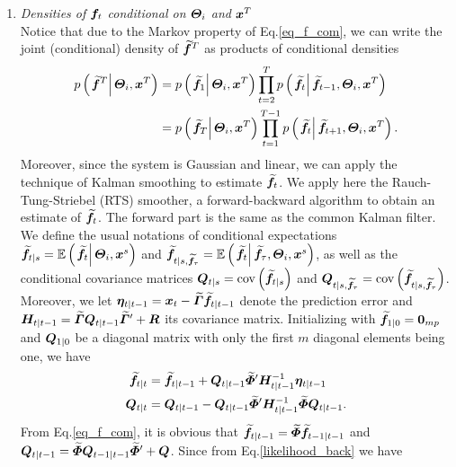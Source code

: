 \begin{enumerate}
\item 
\textit{Densities of $\bm f_t$ conditional on $\bm \varTheta_i$ and $\bm x^T$}\\
Notice that due to the Markov property of Eq.\eqref{eq_f_com}, we can write the joint (conditional) density of $\widetilde{\bm f}^T$ as products of conditional densities
\begin{align}
	p\left(\left.\widetilde{\bm f}^T\right|\bm \varTheta_i,\bm x^T\right)
		&=p\left(\left.\widetilde{\bm f}_1\right|\bm \varTheta_i,\bm x^T\right)
			\prod_{t=2}^Tp\left(\left.\widetilde{\bm f}_t\right|\widetilde{\bm f}_{t-1},\bm \varTheta_i,\bm x^T\right)\\
\label{likelihood_back}
		&=p\left(\left.\widetilde{\bm f}_T\right|\bm \varTheta_i,\bm x^T\right)
			\prod_{t=1}^{T-1}p\left(\left.\widetilde{\bm f}_t\right|\widetilde{\bm f}_{t+1},\bm \varTheta_i,\bm x^T\right).
\end{align}
Moreover, since the system is Gaussian and linear, we can apply the technique of Kalman smoothing to estimate $\widetilde{\bm f}_t$. We apply here the Rauch-Tung-Striebel (RTS) smoother, a forward-backward algorithm to obtain an estimate of $\widetilde{\bm f}_t$. The forward part is the same as the common Kalman filter. We define the usual notations of conditional expectations 
$\widetilde{\bm f}_{t|s}=\mathbb{E}\left(\left.\widetilde{\bm f}_t\right|\bm \varTheta_i,\bm x^s\right)$
and
$\widetilde{\bm f}_{t|s,\widetilde{\bm f}_\tau}=\mathbb{E}\left(\left.\widetilde{\bm f}_t\right|\widetilde{\bm f}_\tau,\bm \varTheta_i,\bm x^s\right)$,
as well as the conditional covariance matrices
$\bm Q_{t|s}=\operatorname{cov}\left(\widetilde{\bm f}_{t|s}\right)$
and
$\bm Q_{t|s,\widetilde{\bm f}_\tau}=\operatorname{cov}\left(\widetilde{\bm f}_{t|s,\widetilde{\bm f}_\tau}\right)$.
Moreover, we let 
$\bm \eta_{t|t-1}=\bm x_t-\widetilde{\bm \varGamma}\widetilde{\bm f}_{t|t-1}$
denote the prediction error and
$\bm H_{t|t-1}=\widetilde{\bm \varGamma}\bm Q_{t|t-1}\widetilde{\bm \varGamma}'+\bm R$
its covariance matrix. Initializing with
$\widetilde{\bm f}_{1|0}=\boldsymbol{0}_{mp}$
and
$\bm Q_{1|0}$ be a diagonal matrix with only the first $m$ diagonal elements being one,
we have
\begin{align}
	\widetilde{\bm f}_{t|t}&=\widetilde{\bm f}_{t|t-1}+\bm Q_{t|t-1}\widetilde{\bm \varPhi}'\bm H_{t|t-1}^{-1}\bm \eta_{t|t-1}\\
	\bm Q_{t|t}&=\bm Q_{t|t-1}-\bm Q_{t|t-1}\widetilde{\bm \varPhi}'\bm H_{t|t-1}^{-1}\widetilde{\bm \varPhi}\bm Q_{t|t-1}.
\end{align}
From Eq.\eqref{eq_f_com}, it is obvious that $\widetilde{\bm f}_{t|t-1}=\widetilde{\bm \varPhi}\widetilde{\bm f}_{t-1|t-1}$ and $\bm Q_{t|t-1}=\widetilde{\bm \varPhi}\bm Q_{t-1|t-1}\widetilde{\bm \varPhi}'+\bm Q$. Since from Eq.\eqref{likelihood_back} we have
\begin{align}
\label{eq_f_T_dist}

\end{align}
\end{enumerate}
